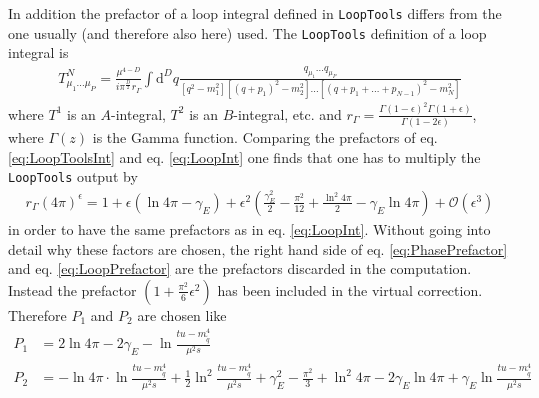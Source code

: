 In addition the prefactor of a loop integral defined in \texttt{LoopTools} differs from the one usually (and therefore also here) used. The \texttt{LoopTools} definition\cite{LoopToolsManual} of a loop integral is 
\begin{align}
T^N_{\mu_1\hdots\mu_P} = \frac{\mu^{4-D}}{i\pi^{\frac{D}{2}}r_\Gamma}\int\mathrm{d}^Dq\frac{q_{\mu_1} \hdots q_{\mu_P}}{[q^2-m_1^2] [(q+p_1)^2-m_2^2] \hdots [(q+p_1+ \hdots +p_{N-1})^2-m_N^2]}\label{eq:LoopToolsInt}
\end{align}
where $T^1$ is an $A$-integral, $T^2$ is an $B$-integral, etc. and $r_\Gamma = \frac{\Gamma(1-\epsilon)^2\Gamma(1+\epsilon)}{\Gamma(1-2\epsilon)}$, where $\Gamma(z)$ is the Gamma function. Comparing the prefactors of eq. \eqref{eq:LoopToolsInt} and eq.  \eqref{eq:LoopInt} one finds that one has to multiply the \texttt{LoopTools} output by
\begin{align}
r_\Gamma (4\pi)^\epsilon = 1 + \epsilon(\ln 4\pi -\gamma_E) + \epsilon^2\left( \frac{\gamma_E^2}{2} - \frac{\pi^2}{12} + \frac{\ln^2 4\pi}{2} - \gamma_E\ln 4\pi \right) + \mathcal{O}(\epsilon^3)\label{eq:LoopPrefactor}
\end{align}
in order to have the same prefactors as in eq. \eqref{eq:LoopInt}. Without going into detail why these factors are chosen, the right hand side of eq. \eqref{eq:PhasePrefactor} and eq. \eqref{eq:LoopPrefactor} are the prefactors discarded in the computation. Instead the prefactor $\left( 1 + \frac{\pi^2}{6}\epsilon^2 \right)$ has been included in the virtual correction. Therefore $P_1$ and $P_2$ are chosen like
\begin{align}
P_1 &=  2\ln 4\pi - 2\gamma_E - \ln \frac{tu - m_{\tilde{q}}^4}{\mu^2 s} \\
P_2 &=  -\ln 4\pi \cdot\ln \frac{tu - m_{\tilde{q}}^4}{\mu^2 s} + \frac{1}{2} \ln^2 \frac{tu - m_{\tilde{q}}^4}{\mu^2 s}  + \gamma_E^2 - \frac{\pi^2}{3} + \ln^2 4\pi - 2\gamma_E\ln 4\pi + \gamma_E \ln \frac{tu - m_{\tilde{q}}^4}{\mu^2 s}  \nonumber
\end{align}


